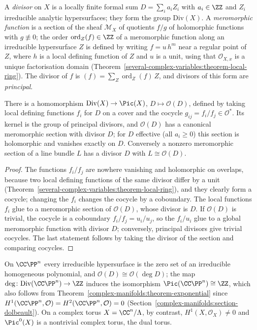 \begin{definition}\label{complex-manifolds:definition-divisor}
A \emph{divisor} on $X$ is a locally finite formal sum $D = \sum_ia_iZ_i$ with $a_i \in \ZZ$ and $Z_i$ irreducible analytic hypersurfaces; they form the group $\mathrm{Div}(X)$. A \emph{meromorphic function}
is a section of the sheaf $\mathcal{M}_X$ of quotients $f/g$ of holomorphic functions with $g \not\equiv 0$; the order $\operatorname{ord}_Z(f) \in \ZZ$ of a meromorphic function along an irreducible
hypersurface $Z$ is defined by writing $f = u\,h^m$ near a regular point of $Z$, where $h$ is a local defining function of $Z$ and $u$ is a unit, using that $\mathcal{O}_{X,x}$ is a unique factorisation domain
(Theorem~\ref{several-complex-variables:theorem-local-ring}). The divisor of $f$ is $(f) = \sum_Z\operatorname{ord}_Z(f)\,Z$, and divisors of this form are \emph{principal}.
\end{definition}

\begin{proposition}\label{complex-manifolds:proposition-divisor-line-bundle}
There is a homomorphism $\mathrm{Div}(X) \to \Pic(X)$, $D \mapsto \mathcal{O}(D)$, defined by taking local defining functions $f_i$ for $D$ on a cover and the cocycle $g_{ij} = f_i/f_j \in \mathcal{O}^*$. Its kernel
is the group of principal divisors, and $\mathcal{O}(D)$ has a canonical meromorphic section with divisor $D$; for $D$ effective (all $a_i \geq 0$) this section is holomorphic and vanishes exactly on $D$.
Conversely a nonzero meromorphic section of a line bundle $L$ has a divisor $D$ with $L \cong \mathcal{O}(D)$.
\end{proposition}

\begin{proof}
The functions $f_i/f_j$ are nowhere vanishing and holomorphic on overlaps, because two local defining functions of the same divisor differ by a unit
(Theorem~\ref{several-complex-variables:theorem-local-ring}), and they clearly form a cocycle; changing the $f_i$ changes the cocycle by a coboundary. The local functions $f_i$ glue to a meromorphic section
of $\mathcal{O}(D)$, whose divisor is $D$. If $\mathcal{O}(D)$ is trivial, the cocycle is a coboundary $f_i/f_j = u_i/u_j$, so the $f_i/u_i$ glue to a global meromorphic function with divisor $D$; conversely,
principal divisors give trivial cocycles. The last statement follows by taking the divisor of the section and comparing cocycles.
\end{proof}

\begin{example}\label{complex-manifolds:example-divisors-projective}
On $\CC\PP^n$ every irreducible hypersurface is the zero set of an irreducible homogeneous polynomial, and $\mathcal{O}(D) \cong \mathcal{O}(\deg D)$; the map $\deg \colon \mathrm{Div}(\CC\PP^n) \to \ZZ$
induces the isomorphism $\Pic(\CC\PP^n) \cong \ZZ$, which also follows from Theorem~\ref{complex-manifolds:theorem-exponential} since $H^1(\CC\PP^n, \mathcal{O}) = H^2(\CC\PP^n, \mathcal{O}) = 0$
(Section~\ref{complex-manifolds:section-dolbeault}). On a complex torus $X = \CC^n/\Lambda$, by contrast, $H^1(X, \mathcal{O}_X) \neq 0$ and $\Pic^0(X)$ is a nontrivial complex torus, the dual torus.
\end{example}

